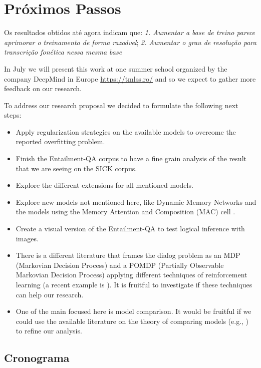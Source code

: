 \chapter{Próximos Passos}
\label{ch04:FutureSteps}


Os resultados obtidos até agora indicam que: \textit{1. Aumentar a base de treino parece aprimorar o treinamento de forma razoável}; \textit{2. Aumentar o grau de resolução para transcrição fonética nessa mesma base} 

In July we will present this work at one summer school organized by the company DeepMind in Europe \url{https://tmlss.ro/} and so we expect to gather more feedback on our research.

To address our research proposal we decided to formulate the following next steps:

\begin{itemize}
\item Apply regularization strategies on the available models to overcome the reported overfitting problem. 
\item Finish the Entailment-QA corpus to have a fine grain analysis of the result that we are seeing on the SICK corpus.
\item Explore the different extensions for all mentioned models.
\item Explore new models not mentioned here, like Dynamic Memory Networks \cite{KumarISBEPOGS15} and the models using the Memory Attention and Composition (MAC) cell \cite{Manning18}.
\item Create a visual version of the Entailment-QA to test logical inference with images.
\item There is a different literature that frames the dialog problem as an MDP (Markovian Decision Process) and a POMDP (Partially Observable Markovian Decision Process) applying different techniques of reinforcement learning (a recent example is \cite{Li:2016}). It is fruitful to investigate if these techniques can help our research.
\item One of the main focused here is model comparison. It would be fruitful if we could use the available literature  on the theory of comparing models (e.g.,  \cite{BenavoliCDZ17}) to refine our analysis.
\end{itemize}


\section{Cronograma}
\label{sec:work-plan}

